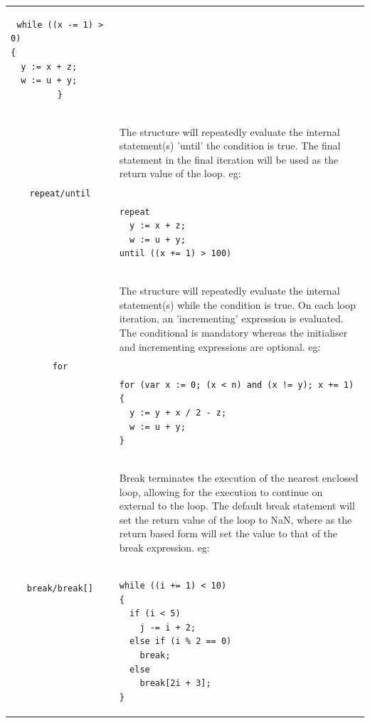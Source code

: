 \documentclass{book}
\begin{document}
{\begin{tabular}{|c|p{}|}
\begin{verbatim}
while ((x -= 1) > 0)                                   
{                                                      
  y := x + z;                                          
  w := u + y;                                          
}\end{verbatim}

  \\
\verb'repeat/until'& The structure will repeatedly evaluate the internal
statement(s) 'until' the condition is true. The final
statement in the final iteration will be used as the 
return value of the loop.                            
eg:
\begin{verbatim}

repeat                                               
  y := x + z;                                        
  w := u + y;                                        
until ((x += 1) > 100)\end{verbatim}

\\
\verb'for'& The structure will repeatedly evaluate the internal    
statement(s) while the condition is true. On each loop
iteration, an 'incrementing' expression is evaluated. 
The conditional is mandatory whereas the initialiser  
and incrementing expressions are optional.            
eg:                                                   
\begin{verbatim}

for (var x := 0; (x < n) and (x != y); x += 1)        
{                                                     
  y := y + x / 2 - z;                                 
  w := u + y;                                         
}\end{verbatim}

\\
\verb'break/break[]'& Break terminates the execution of the nearest enclosed 
loop, allowing for the execution to continue on external
to the loop. The default break statement will set the   
return value of the loop to NaN, where as the return    
based form will set the value to that of the break      
expression.                                             
eg:
\begin{verbatim}

while ((i += 1) < 10)                                   
{                                                       
  if (i < 5)                                            
    j -= i + 2;                                         
  else if (i % 2 == 0)                                  
    break;                                              
  else                                                  
    break[2i + 3];                                      
}\end{verbatim}


\end{tabular}}
\end{document}
